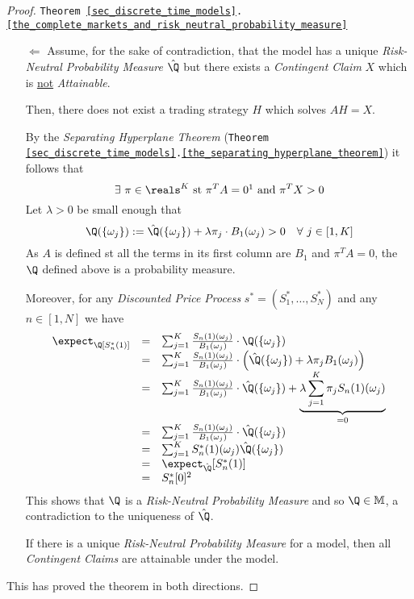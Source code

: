 \documentclass[11pt,a4paper]{article}
\begin{document}
\begin{proof}{\texttt{Theorem \ref{sec_discrete_time_models}.\ref{the_complete_markets_and_risk_neutral_probability_measure}}}
\begin{itemize}
      \item[$\Longleftarrow$] Assume, for the sake of contradiction, that the model has a unique \textit{Risk-Neutral Probability Measure} $\hat\Q$ but there exists a \textit{Contingent Claim} $X$ which is \underline{not} \textit{Attainable}.
      \par Then, there does not exist a trading strategy $H$ which solves $AH=X$.
      \par By the \textit{Separating Hyperplane Theorem} (\texttt{Theorem \ref{sec_discrete_time_models}.\ref{the_separating_hyperplane_theorem}}) it follows that
      \[ \exists\ \pi\in\reals^K\text{ st }\pi^TA=0\footnotemark\text{ and }\pi^TX>0 \]
      Let $\lambda>0$ be small enough that
      \[ \Q(\{\omega_j\}):=\hat\Q(\{\omega_j\})+\lambda\pi_j\cdot B_1(\omega_j)>0\quad\forall\ j\in[1,K] \]
      As $A$ is defined st all the terms in its first column are $B_1$ and $\pi^TA=0$, the $\Q$ defined above is a probability measure.
      \par Moreover, for any \textit{Discounted Price Process} $s^*=(S_1^*,\dots,S_N^*)$ and any $n\in[1,N]$ we have
      \[\begin{array}{rcl}
        \expect_\Q[S_n^*(1)]&=&\sum_{j=1}^K\frac{S_n(1)(\omega_j)}{B_1(\omega_j)}\cdot\Q(\{\omega_j\})\\
        &=&\sum_{j=1}^K\frac{S_n(1)(\omega_j)}{B_1(\omega_j)}\cdot\left(\hat\Q(\{\omega_j\})+\lambda\pi_jB_1(\omega_j)\right)\\
        &=&\sum_{j=1}^K\frac{S_n(1)(\omega_j)}{B_1(\omega_j)}\cdot\hat\Q(\{\omega_j\})+\underbrace{\lambda\sum_{j=1}^K\pi_jS_n(1)(\omega_j)}_{=0}\\
        &=&\sum_{j=1}^K\frac{S_n(1)(\omega_j)}{B_1(\omega_j)}\cdot\hat\Q(\{\omega_j\})\\
        &=&\sum_{j=1}^KS_n^*(1)(\omega_j)\hat\Q(\{\omega_j\})\\
        &=&\expect_{\hat\Q}[S_n^*(1)]\\
        &=&S_n^*[0]\footnotemark
      \end{array}\]
      This shows that $\Q$ is a \textit{Risk-Neutral Probability Measure} and so $\Q\in\mathbb{M}$, a contradiction to the uniqueness of $\hat\Q$.
      \par If there is a unique \textit{Risk-Neutral Probability Measure} for a model, then all \textit{Contingent Claims} are attainable under the model.
    \end{itemize}
    This has proved the theorem in both directions.\proved
  \end{proof}
\end{document}
